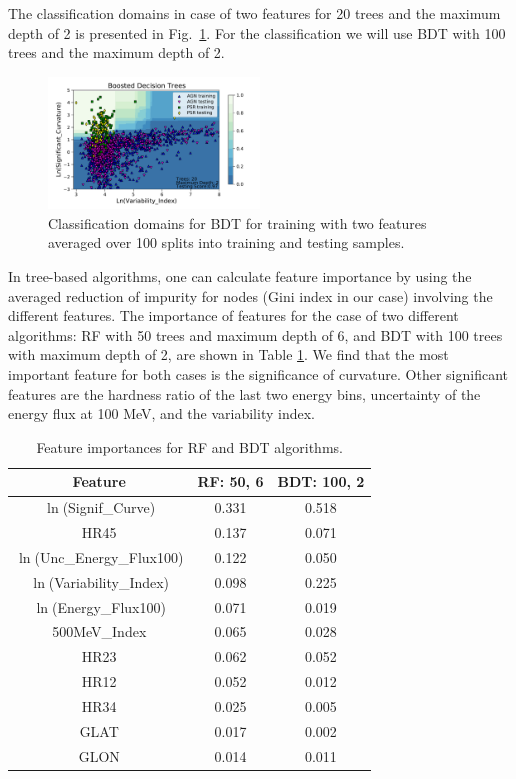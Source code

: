 The classification domains in case of two features for 20 trees and the maximum depth of 2 is presented in Fig.~\ref{fig:BDT_domains}. 
For the classification we will use BDT with 100 trees and the maximum depth of 2.


\begin{figure}[h]
\centering
\includegraphics[width=0.5\textwidth]{plots/classification_domains/bdt_20_2.pdf}
\caption{Classification domains for BDT for training with two features 
averaged over 100 splits into training and testing samples.
}
\label{fig:BDT_domains}
\end{figure}



In tree-based algorithms, one can calculate feature importance by using the averaged reduction of impurity for nodes (Gini index in our case) involving the different features. 
The importance of features for the case of two different algorithms: RF with 50 trees and maximum depth of 6, and BDT with 100 trees with maximum depth of 2,  are shown in Table \ref{tab:feat_imp}.
We find that the most important feature for both cases is the significance of curvature.
Other significant features are the hardness ratio of the last two energy bins, uncertainty of the energy flux at 100 MeV, and the variability index.


\begin{table}[!h]
\caption{Feature importances for RF and BDT algorithms.
}
\label{tab:feat_imp}
\tiny
\centering
\renewcommand{\tabcolsep}{1mm}
\renewcommand{\arraystretch}{1}

\begin{tabular}{c c c}
\hline
\hline
Feature & RF: 50, 6 & BDT: 100, 2\\
\hline
{ $\ln$(Signif\_Curve)}&  0.331  & 0.518   \\
{ HR45}&0.137&0.071\\
{ $\ln$(Unc\_Energy\_Flux100)} &0.122& 0.050   \\
$\ln$(Variability\_Index)& 0.098&0.225  \\
$\ln$(Energy\_Flux100) & 0.071&0.019   \\
500MeV\_Index&0.065& 0.028  \\
HR23 & 0.062&0.052  \\
HR12& 0.052&0.012  \\
HR34&0.025&0.005\\
GLAT &0.017& 0.002     \\
GLON & 0.014&0.011  \\
\hline
\end{tabular}
\end{table}


